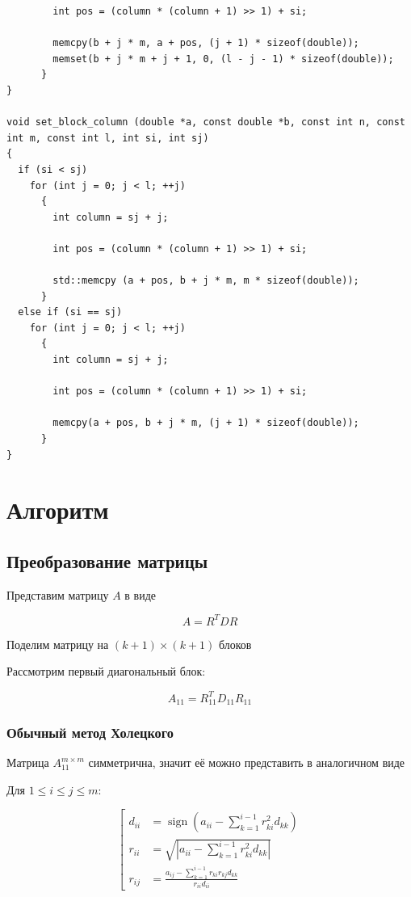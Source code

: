 \documentclass[a4paper,12pt]{article}
\begin{document}
\begin{lstlisting}
        int pos = (column * (column + 1) >> 1) + si;

        memcpy(b + j * m, a + pos, (j + 1) * sizeof(double));
        memset(b + j * m + j + 1, 0, (l - j - 1) * sizeof(double));
      }
}

void set_block_column (double *a, const double *b, const int n, const int m, const int l, int si, int sj)
{
  if (si < sj)
    for (int j = 0; j < l; ++j)
      {
        int column = sj + j;

        int pos = (column * (column + 1) >> 1) + si;

        std::memcpy (a + pos, b + j * m, m * sizeof(double));
      }
  else if (si == sj)
    for (int j = 0; j < l; ++j)
      {
        int column = sj + j;

        int pos = (column * (column + 1) >> 1) + si;

        memcpy(a + pos, b + j * m, (j + 1) * sizeof(double));
      }
}
\end{lstlisting}

\section{Алгоритм}

\subsection{Преобразование матрицы}

Представим матрицу $A$ в виде

$$
A = R^T D R
$$

Поделим матрицу на $(k+1) \times (k+1)$ блоков

Рассмотрим первый диагональный блок:

$$
A_{11} = R_{11}^T D_{11} R_{11}
$$


\subsubsection{Обычный метод Холецкого}

Матрица $A_{11}^{m \times m}$ симметрична, значит её можно представить
в аналогичном виде

Для $1 \leq i \leq j \leq m$:

$$
\left[
\begin{aligned}
  d_{ii} &= \operatorname{sign}(a_{ii} - \sum_{k=1}^{i-1} r_{ki}^2 d_{kk}) \\
  r_{ii} &= \sqrt{\left| a_{ii} - \sum_{k=1}^{i-1} r_{ki}^2 d_{kk} \right|} \\
  r_{ij} &= \frac{a_{ij} - \sum_{k=1}^{i-1} r_{ki} r_{kj} d_{kk}}{r_{ii} d_{ii}}
\end{aligned}
\right.
$$
\end{document}
